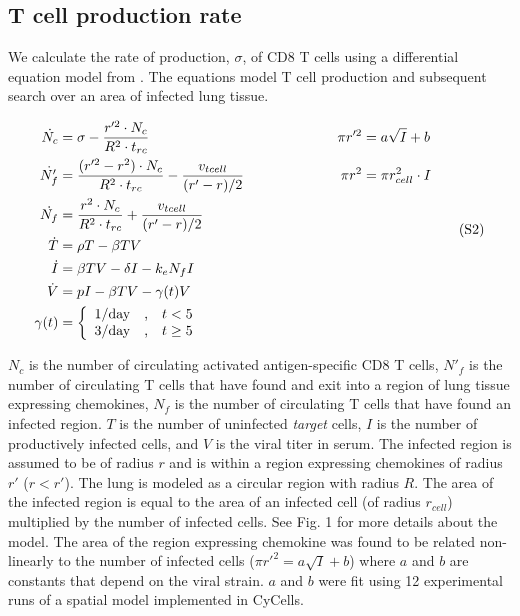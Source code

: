 \documentclass[10pt]{article}
\begin{document}
\subsection{T cell production rate}

We calculate the rate of production, $\sigma$, of CD8 T cells using a differential equation model from \cite{Miao2010}.  The equations model T cell production and subsequent search over an area of infected lung tissue.

{\footnotesize
\begin{equation*}
\label{eq:miao}
\begin{aligned}
\dot{N_{c}} &= \sigma - \frac{r'^{2} \cdot N_{c}}{R^{2} \cdot t_{rc}} & \pi r'^{2} &= a \sqrt{I} + b \\
\dot{N'_{f}} &= \frac{(r'^{2} - r^{2}) \cdot N_{c}}{R^{2} \cdot t_{rc}} - \frac{v_{tcell}}{(r' - r) / 2} \hspace*{2cm}  & \pi r^{2} &= \pi r_{cell}^{2} \cdot I \\
\dot{N_{f}} &= \frac{r^{2} \cdot N_{c}}{R^{2} \cdot t_{rc}} + \frac{v_{tcell}}{(r' - r) / 2} \\
\dot{T} &= \rho T -\beta TV \\
\dot{I} &= \beta TV - \delta I - k_{e} N_{f} I \\
\dot{V} &= pI - \beta TV - \gamma (t) V \\
\gamma (t) &= \left\{ \begin{array}{rcl}
	1/\mbox{day} & \mbox{,}  & t < 5  \\
	3/\mbox{day} & \mbox{,} & t \geq 5  
	\end{array}\right. \\
\end{aligned}
\tag{S2}
\end{equation*}
}
\vspace{0.5in}


$N_{c}$ is the number of circulating activated antigen-specific CD8 T cells, $N'_{f}$ is the number of circulating T cells that have found and exit into a region of lung tissue expressing chemokines, $N_{f}$ is the number of circulating T cells that have found an infected region. $T$ is the number of uninfected \textit{target} cells, $I$ is the number of productively infected cells, and $V$ is the viral titer in serum. The infected region is assumed to be of radius $r$ and is within a region expressing chemokines of radius $r'$ ($r  < r'$). The lung is modeled as a circular region with radius $R$. The area of the infected region is equal to the area of an infected cell (of radius $r_{cell}$) multiplied by the number of infected cells. See Fig. 1 for more details about the model.  The area of the region expressing chemokine was found to be related non-linearly to the number of infected cells ($\pi r'^{2} = a \sqrt{I} + b$) where $a$ and $b$ are constants that depend on the viral strain.  $a$ and $b$ were fit using 12 experimental runs of a spatial model implemented in CyCells.
\end{document}
